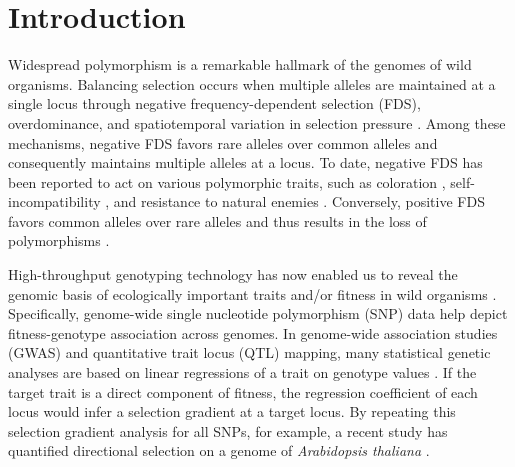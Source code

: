 \documentclass[12pt,]{article}
\begin{document}
\section{Introduction}
Widespread polymorphism is a remarkable hallmark of the genomes of wild organisms. Balancing selection occurs when multiple alleles are maintained at a single locus through negative frequency-dependent selection (FDS), overdominance, and spatiotemporal variation in selection pressure \citep{hedrick2007balancing}. Among these mechanisms, negative FDS favors rare alleles over common alleles and consequently maintains multiple alleles at a locus. To date, negative FDS has been reported to act on various polymorphic traits, such as coloration \citep{gigord2001negative, takahashi2010negative, le2015evolutionary, nosil2018natural}, self-incompatibility \citep{llaurens2008does, joly2011migration, shimizu2015evolution}, and resistance to natural enemies \citep{antonovics1984experimental, brunet2000disease, sato2017herbivore}. Conversely, positive FDS favors common alleles over rare alleles and thus results in the loss of polymorphisms \citep{borer2010positive, garrido2016effect}.

High-throughput genotyping technology has now enabled us to reveal the genomic basis of ecologically important traits and/or fitness in wild organisms \citep{durham_genome-wide_2014, fisher_genetic_2016, nosil2018natural, exposito2019natural, tsuchimatsu2020adaptive}. Specifically, genome-wide single nucleotide polymorphism (SNP) data help depict fitness-genotype association across genomes. In genome-wide association studies (GWAS) and quantitative trait locus (QTL) mapping, many statistical genetic analyses are based on linear regressions of a trait on genotype values \citep{broman2009single, gondro2013genome}. If the target trait is a direct component of fitness, the regression coefficient of each locus would infer a selection gradient \citep{lande1983measurement} at a target locus. By repeating this selection gradient analysis for all SNPs, for example, a recent study has quantified directional selection on a genome of \textit{Arabidopsis thaliana} \citep{exposito2019natural}.
\end{document}
